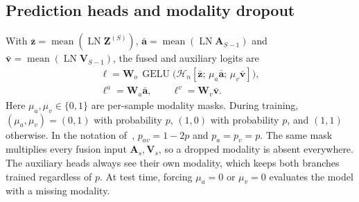 \subsection{Prediction heads and modality dropout}
\label{sec:heads}
With $\bar{\mathbf{z}}=\operatorname{mean}(\operatorname{LN}\mathbf{Z}^{(S)})$,
$\bar{\mathbf{a}}=\operatorname{mean}(\operatorname{LN}\mathbf{A}_{S-1})$ and
$\bar{\mathbf{v}}=\operatorname{mean}(\operatorname{LN}\mathbf{V}_{S-1})$, the fused and auxiliary logits are
\begin{equation}
\begin{gathered}
  \boldsymbol{\ell} = \mathbf{W}_o\,\operatorname{GELU}\big(\mathcal{H}_n[\bar{\mathbf{z}};\,\mu_a\bar{\mathbf{a}};\,\mu_v\bar{\mathbf{v}}]\big),\\
  \boldsymbol{\ell}^{a} = \mathbf{W}_a\bar{\mathbf{a}},\qquad \boldsymbol{\ell}^{v} = \mathbf{W}_v\bar{\mathbf{v}}.
\end{gathered}
  \label{eq:heads}
\end{equation}
Here $\mu_a,\mu_v\in\{0,1\}$ are per-sample modality masks. During training,
$(\mu_a,\mu_v)=(0,1)$ with probability $p$, $(1,0)$ with probability $p$, and $(1,1)$ otherwise. In the
notation of~\cite{cui2024uffia}, $p_{av}=1-2p$ and $p_a=p_v=p$. The same mask multiplies every fusion
input $\mathbf{A}_s,\mathbf{V}_s$, so a dropped modality is absent everywhere. The auxiliary heads always see
their own modality, which keeps both branches trained regardless of $p$. At test time, forcing
$\mu_a=0$ or $\mu_v=0$ evaluates the model with a missing modality.

